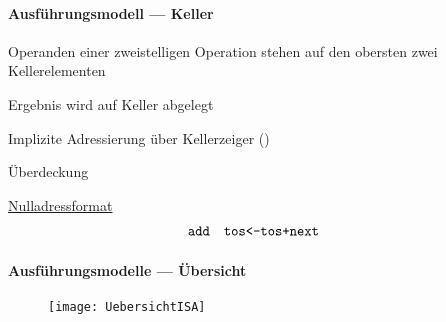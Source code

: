 \paragraph{Ausführungsmodell --- Keller}
\begin{items}
	\item Operanden einer zweistelligen Operation stehen auf den obersten zwei Kellerelementen
	\item Ergebnis wird auf Keller abgelegt
	\item Implizite Adressierung über Kellerzeiger ()
	\item Überdeckung
	\item \underline{Nulladressformat}
	\begin{align*}
		\text{\code{add}} &\quad \text{\code{tos<-tos+next}}
	\end{align*}
\end{items}

\paragraph{Ausführungsmodelle --- Übersicht}
\begin{items}
	\item 
	\begin{center}
	\end{center}
	\begin{figure}[H]
	  \centering
	  \texttt{[image: UebersichtISA]}
	  \label{UebersichtISA}
	\end{figure}
\end{items}

